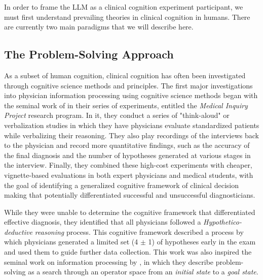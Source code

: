 In order to frame the LLM as a clinical cognition experiment participant, we must first understand prevailing theories in clinical cognition in humans. There are currently two main paradigms that we will describe here. 

\subsection{The Problem-Solving Approach}
As a subset of human cognition, clinical cognition has often been investigated through cognitive science methods and principles. The first major investigations into physician information processing using cognitive science methods began with the seminal work of \citet{elstein1978medical} in their series of experiments, entitled the \emph{Medical Inquiry Project} research program. In it, they conduct a series of "think-aloud" or verbalization studies in which they have physicians evaluate standardized patients while verbalizing their reasoning. They also play recordings of the interviews back to the physician and record more quantitative findings, such as the accuracy of the final diagnosis and the number of hypotheses generated at various stages in the interview. Finally, they combined these high-cost experiments with cheaper, vignette-based evaluations in both expert physicians and medical students, with the goal of identifying a generalized cognitive framework of clinical decision making that potentially differentiated successful and unsuccessful diagnosticians.


While they were unable to determine the cognitive framework that differentiated effective diagnosis, they identified that all physicians followed a \emph{Hypothetico-deductive reasoning} process. This cognitive framework described a process by which physicians generated a limited set (4 $\pm$ 1) of hypotheses early in the exam and used them to guide further data collection. This work was also inspired the seminal work on information processing by \citet{simonHumanProblemSolving1971}, in which they describe problem-solving as a search through an operator space from an \emph{initial state} to a \emph{goal state}. 


